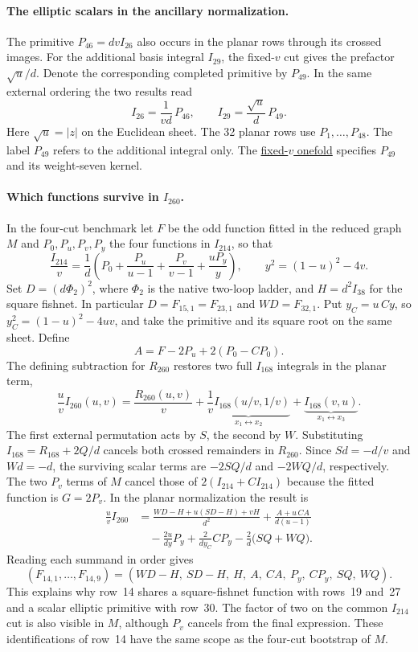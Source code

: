 \paragraph{The elliptic scalars in the ancillary normalization.}
The primitive \(P_{46}=dvI_{26}\) also occurs in the planar rows through its
crossed images. For the additional basis integral \(I_{29}\), the fixed-\(v\)
cut gives the prefactor \(\sqrt u/d\). Denote the corresponding completed
primitive by \(P_{49}\). In the same external ordering the two results read
\[
 \boxed{\displaystyle I_{26}=\frac{1}{vd}\,P_{46},\qquad
 I_{29}=\frac{\sqrt u}{d}\,P_{49}.}
\]
Here \(\sqrt u=|z|\) on the Euclidean sheet. The 32 planar rows use
\(P_1,\ldots,P_{48}\). The label \(P_{49}\) refers to the additional
integral only. The \hyperref[app:i29kernel]{fixed-\(v\) onefold}
specifies \(P_{49}\) and its weight-seven kernel.
\clearpage

\paragraph{Which functions survive in \(I_{260}\).}
In the four-cut benchmark let \(F\) be the odd function fitted in the reduced
graph \(M\) and \(P_0,P_u,P_v,P_y\) the four functions in \(I_{214}\), so that
\[
 \frac{I_{214}}{v}=\frac1d
 \left(P_0+\frac{P_u}{u-1}+\frac{P_v}{v-1}+\frac{uP_y}{y}\right),
 \qquad y^2=(1-u)^2-4v .
\]
Set \(D=(d\Phi_2)^2\), where \(\Phi_2\) is the native two-loop ladder, and
\(H=d^2 I_{38}\) for the square fishnet. In particular \(D=F_{15,1}=F_{23,1}\)
and \(WD=F_{32,1}\). Put \(y_C=u\,Cy\), so
\(y_C^2=(1-u)^2-4uv\), and take the primitive and its square root on the same sheet.
Define
\[
 A=F-2P_u+2(P_0-CP_0).
\]
The defining subtraction for \(R_{260}\) restores two full \(I_{168}\)
integrals in the planar term,
\[
 \frac{u}{v}I_{260}(u,v)=\frac{R_{260}(u,v)}{v}
 +\underbrace{\frac{1}{v}I_{168}(u/v,1/v)}_{x_1\leftrightarrow x_2}
 +\underbrace{I_{168}(v,u)}_{x_1\leftrightarrow x_3}.
\]
The first external permutation acts by \(S\), the second by \(W\).
Substituting \(I_{168}=R_{168}+2Q/d\) cancels both crossed remainders in
\(R_{260}\). Since \(Sd=-d/v\) and \(Wd=-d\), the surviving scalar terms are
\(-2SQ/d\) and \(-2WQ/d\), respectively. The two \(P_v\) terms of \(M\) cancel those of
\(2(I_{214}+CI_{214})\) because the fitted function is \(G=2P_v\).
In the planar normalization the result is
\begin{align*}
 \frac{u}{v} I_{260}
 &=\frac{WD-H+u(SD-H)+vH}{d^2}
   +\frac{A+u\,CA}{d(u-1)}\\
 &\quad-\frac{2u}{d y}P_y+\frac{2}{d y_C}CP_y
     -\frac{2}{d}\big(SQ+WQ\big).
\end{align*}
Reading each summand in order gives
\[
 (F_{14,1},\ldots,F_{14,9})=
 (WD-H,\ SD-H,\ H,\ A,\ CA,\ P_y,\ CP_y,\ SQ,\ WQ).
\]
This explains why row~14 shares a square-fishnet function with rows~19
and~27 and a scalar elliptic primitive with row~30. The factor of two on
the common \(I_{214}\) cut is also visible in \(M\), although \(P_v\) cancels
from the final expression. These identifications of row~14 have the same
scope as the four-cut bootstrap of \(M\).

